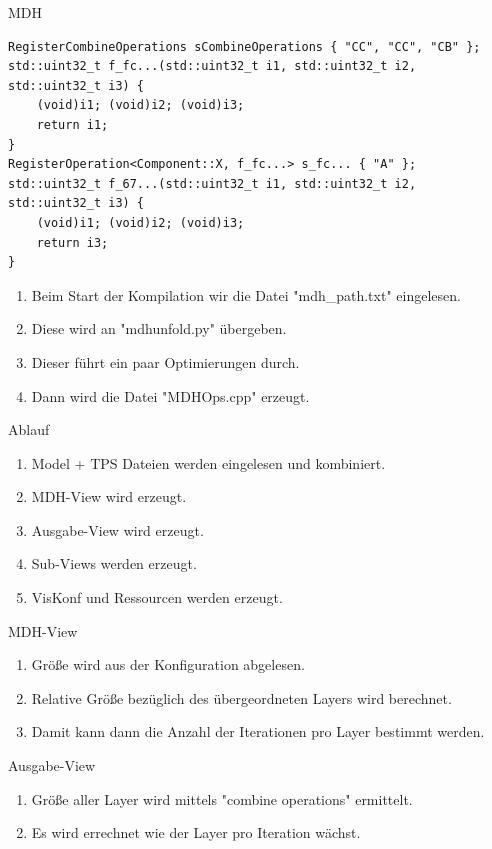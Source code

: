 \documentclass{presentation}
\begin{document}
\begin{frame}[fragile]{MDH}
    \begin{lstlisting}[style=context]
RegisterCombineOperations sCombineOperations { "CC", "CC", "CB" }; 
std::uint32_t f_fc...(std::uint32_t i1, std::uint32_t i2, std::uint32_t i3) {
    (void)i1; (void)i2; (void)i3;
    return i1;
}
RegisterOperation<Component::X, f_fc...> s_fc... { "A" };
std::uint32_t f_67...(std::uint32_t i1, std::uint32_t i2, std::uint32_t i3) {
    (void)i1; (void)i2; (void)i3;
    return i3;
}
    \end{lstlisting}

    \begin{enumerate}
        \item Beim Start der Kompilation wir die Datei "mdh\_path.txt" eingelesen.
        \item Diese wird an "mdhunfold.py" übergeben.
        \item Dieser führt ein paar Optimierungen durch.
        \item Dann wird die Datei "MDHOps.cpp" erzeugt.
    \end{enumerate}
\end{frame}

\begin{frame}{Ablauf}
    \begin{enumerate}
        \item Model + TPS Dateien werden eingelesen und kombiniert.
        \item MDH-View wird erzeugt.
        \item Ausgabe-View wird erzeugt.
        \item Sub-Views werden erzeugt.
        \item VisKonf und Ressourcen werden erzeugt.
    \end{enumerate}
\end{frame}

\begin{frame}{MDH-View}
    \begin{enumerate}
        \item Größe wird aus der Konfiguration abgelesen.
        \item Relative Größe bezüglich des übergeordneten Layers wird berechnet.
        \item Damit kann dann die Anzahl der Iterationen pro Layer bestimmt werden.
    \end{enumerate}
\end{frame}

\begin{frame}{Ausgabe-View}
    \begin{enumerate}
        \item Größe aller Layer wird mittels "combine operations" ermittelt.
        \item Es wird errechnet wie der Layer pro Iteration wächst.
    \end{enumerate}
\end{frame}
\end{document}
